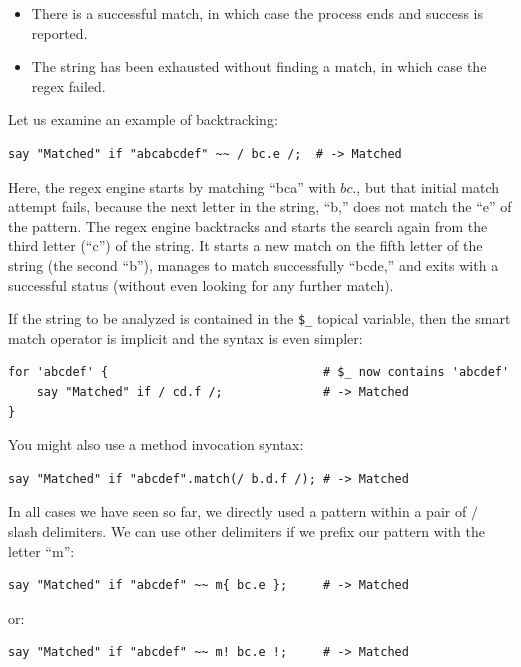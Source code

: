 \begin{itemize}
\item There is a successful match, in which case the process 
ends and success is reported. 
\item The string has been exhausted without finding a match, 
in which case the regex failed.
\end{itemize}

Let us examine an example of backtracking:
\begin{verbatim}
say "Matched" if "abcabcdef" ~~ / bc.e /;  # -> Matched
\end{verbatim}
%
Here, the regex engine starts by matching ``bca'' with 
$bc.$, but that initial match attempt fails, because the 
next letter in the string, ``b,'' does not match the ``e'' 
of the pattern. The regex engine backtracks and starts the 
search again from the third letter (``c'') of the string. 
It starts a new match on the fifth letter of the string 
(the second ``b''), manages to match successfully ``bcde,'' and 
exits with a successful status (without even looking for any 
further match).

If the string to be analyzed is contained in the \verb'$_' 
topical variable, then the smart match operator is implicit 
and the syntax is even simpler:

\begin{verbatim}
for 'abcdef' {                              # $_ now contains 'abcdef'
    say "Matched" if / cd.f /;              # -> Matched
}
\end{verbatim}
%

You might also use a method invocation syntax:
\begin{verbatim}
say "Matched" if "abcdef".match(/ b.d.f /); # -> Matched
\end{verbatim}
%

In all cases we have seen so far, we directly used a pattern 
within a pair of $/$ slash delimiters. We can use other 
delimiters if we prefix our pattern with the letter ``m'':

\begin{verbatim}
say "Matched" if "abcdef" ~~ m{ bc.e };     # -> Matched
\end{verbatim}
%

or:
\begin{verbatim}
say "Matched" if "abcdef" ~~ m! bc.e !;     # -> Matched
\end{verbatim}
%


